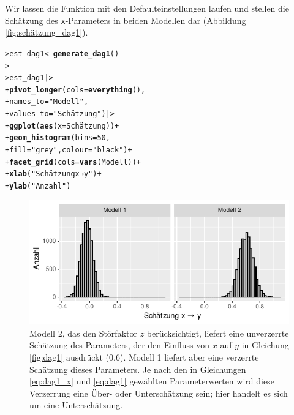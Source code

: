 \documentclass[oneside, 10pt]{book}\usepackage[]{graphicx}\usepackage[]{xcolor}
\makeatletter
\newcommand{\hlnum}[1]{\textcolor[rgb]{0.686,0.059,0.569}{#1}}%
\newcommand{\hlstr}[1]{\textcolor[rgb]{0.192,0.494,0.8}{#1}}%
\newcommand{\hlopt}[1]{\textcolor[rgb]{0,0,0}{#1}}%
\newcommand{\hlstd}[1]{\textcolor[rgb]{0.345,0.345,0.345}{#1}}%
\newcommand{\hlkwb}[1]{\textcolor[rgb]{0.69,0.353,0.396}{#1}}%
\newcommand{\hlkwc}[1]{\textcolor[rgb]{0.333,0.667,0.333}{#1}}%
\newcommand{\hlkwd}[1]{\textcolor[rgb]{0.737,0.353,0.396}{\textbf{#1}}}%
\newenvironment{kframe}{%
 \def\at@end@of@kframe{}%
 \ifinner\ifhmode%
  \def\at@end@of@kframe{\end{minipage}}%
  \begin{minipage}{\columnwidth}%
 \fi\fi%
 \def\FrameCommand##1{\hskip\@totalleftmargin \hskip-\fboxsep
 \colorbox{shadecolor}{##1}\hskip-\fboxsep
     \hskip-\linewidth \hskip-\@totalleftmargin \hskip\columnwidth}%
 \MakeFramed {\advance\hsize-\width
   \@totalleftmargin\z@ \linewidth\hsize
   \@setminipage}}%
 {\par\unskip\endMakeFramed%
 \at@end@of@kframe}
\newenvironment{knitrout}{}{} %
\makeatother
\begin{document}
Wir lassen die Funktion mit den Defaulteinstellungen laufen
und stellen die Schätzung des \texttt{x}-Parameters in beiden
Modellen dar (Abbildung \ref{fig:schätzung_dag1}).
\begin{knitrout}
\color{fgcolor}\begin{kframe}
\begin{alltt}
\hlstd{> }\hlstd{est_dag1} \hlkwb{<-} \hlkwd{generate_dag1}\hlstd{()}
\hlstd{> }
\hlstd{> }\hlstd{est_dag1 |>}
\hlstd{+ }  \hlkwd{pivot_longer}\hlstd{(}\hlkwc{cols} \hlstd{=} \hlkwd{everything}\hlstd{(),}
\hlstd{+ }               \hlkwc{names_to} \hlstd{=} \hlstr{"Modell"}\hlstd{,}
\hlstd{+ }               \hlkwc{values_to} \hlstd{=} \hlstr{"Schätzung"}\hlstd{) |>}
\hlstd{+ }  \hlkwd{ggplot}\hlstd{(}\hlkwd{aes}\hlstd{(}\hlkwc{x} \hlstd{= Schätzung))} \hlopt{+}
\hlstd{+ }  \hlkwd{geom_histogram}\hlstd{(}\hlkwc{bins} \hlstd{=} \hlnum{50}\hlstd{,}
\hlstd{+ }                 \hlkwc{fill} \hlstd{=} \hlstr{"grey"}\hlstd{,} \hlkwc{colour} \hlstd{=} \hlstr{"black"}\hlstd{)} \hlopt{+}
\hlstd{+ }  \hlkwd{facet_grid}\hlstd{(}\hlkwc{cols} \hlstd{=} \hlkwd{vars}\hlstd{(Modell))} \hlopt{+}
\hlstd{+ }  \hlkwd{xlab}\hlstd{(}\hlstr{"Schätzung x → y"}\hlstd{)} \hlopt{+}
\hlstd{+ }  \hlkwd{ylab}\hlstd{(}\hlstr{"Anzahl"}\hlstd{)}
\end{alltt}
\end{kframe}\begin{figure}[tp]

{\centering \includegraphics[width=.5\textwidth]{figs/unnamed-chunk-308-1} 

}

\caption{Modell 2, das den Störfaktor $z$ berücksichtigt, liefert eine unverzerrte Schätzung des Parameters, der den Einfluss von $x$ auf $y$ in Gleichung \ref{fig:dag1} ausdrückt (0.6). Modell 1 liefert aber eine verzerrte Schätzung dieses Parameters. Je nach den in Gleichungen \ref{eq:dag1_x} und \ref{eq:dag1} gewählten Parameterwerten wird diese Verzerrung eine Über- oder Unterschätzung sein; hier handelt es sich um eine Unterschätzung.\label{fig:schätzung_dag1}}\label{fig:unnamed-chunk-308}
\end{figure}

\end{knitrout}
\end{document}
